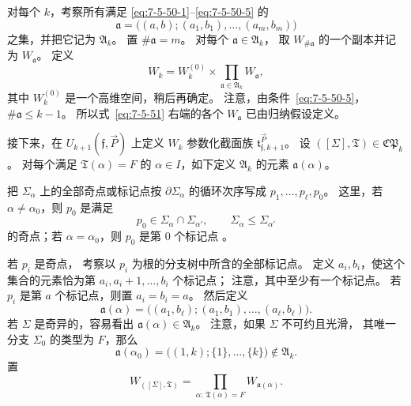 对每个 $k$，考察所有满足
\eqref{eq:7-5-50-1}--\eqref{eq:7-5-50-5} 的
\[
\mathfrak a=
\bigl((a,b);(a_1,b_1),\ldots,(a_m,b_m)\bigr)
\]
之集，并把它记为 $\mathfrak A_k$。
置 $\#\mathfrak a=m$。
对每个 $\mathfrak a\in\mathfrak A_k$，
取 $W_{\#\mathfrak a}$ 的一个副本并记为
$W_{\mathfrak a}$。
定义
\begin{equation}
W_k=W_k^{(0)}\times
\prod_{\mathfrak a\in\mathfrak A_k}W_{\mathfrak a},
\tag{7.5.51}\label{eq:7-5-51}
\end{equation}
其中 $W_k^{(0)}$ 是一个高维空间，稍后再确定。
注意，由条件~\eqref{eq:7-5-50-5}，
$\#\mathfrak a\leq k-1$。
所以式~\eqref{eq:7-5-51} 右端的各个
$W_{\mathfrak a}$ 已由归纳假设定义。

接下来，在 $U_{k+1}(\mathfrak f,\vec P)$ 上定义
$W_k$ 参数化截面族
$\mathfrak t_{\mathfrak f,k+1}^{\vec P}$。
设
$([\Sigma],\mathfrak T)\in\mathfrak{CP}_k$。
对每个满足 $\mathfrak T(\alpha)=F$ 的
$\alpha\in I$，如下定义
$\mathfrak A_k$ 的元素 $\mathfrak a(\alpha)$。

把 $\Sigma_\alpha$ 上的全部奇点或标记点按
$\partial\Sigma_\alpha$ 的循环次序写成
$p_1,\ldots,p_\ell,p_0$。
这里，若 $\alpha\neq\alpha_0$，则 $p_0$ 是满足
\[
p_0\in\Sigma_\alpha\cap\Sigma_{\alpha'},
\qquad
\Sigma_\alpha\leq\Sigma_{\alpha'}
\]
的奇点；若 $\alpha=\alpha_0$，则 $p_0$ 是第 $0$ 个标记点
。

若 $p_i$ 是奇点，
考察以 $p_i$ 为根的分支树中所含的全部标记点。
定义 $a_i,b_i$，使这个集合的元素恰为第
$a_i,a_i+1,\ldots,b_i$ 个标记点；
注意，其中至少有一个标记点。
若 $p_i$ 是第 $a$ 个标记点，则置
$a_i=b_i=a$。
然后定义
\[
\mathfrak a(\alpha)
=\bigl((a_1,b_\ell);
(a_1,b_1),\ldots,(a_\ell,b_\ell)\bigr).
\]
若 $\Sigma$ 是奇异的，容易看出
$\mathfrak a(\alpha)\in\mathfrak A_k$。
注意，如果 $\Sigma$ 不可约且光滑，
其唯一分支 $\Sigma_0$ 的类型为 $F$，那么
\[
\mathfrak a(\alpha_0)
=\bigl((1,k);\{1\},\ldots,\{k\}\bigr)
\notin\mathfrak A_k.
\]
置
\[
W_{([\Sigma],\mathfrak T)}
=\prod_{\alpha:\,\mathfrak T(\alpha)=F}
W_{\mathfrak a(\alpha)}.
\]

